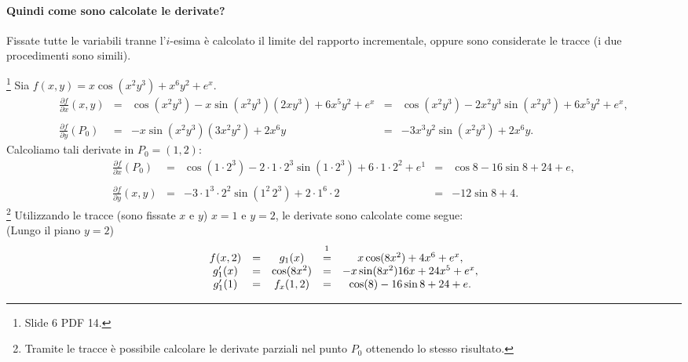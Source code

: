 \paragraph{Quindi come sono calcolate le derivate?} Fissate tutte le variabili tranne l'$i$-esima è calcolato il limite del rapporto incrementale, oppure sono considerate le tracce (i due procedimenti sono simili).

\begin{example}\footnote{Slide 6 PDF 14.}
    Sia $f(x,y)=x\cos(x^2y^3)+x^6y^2+e^x$.
    \begin{equation}\label{eq:derivate_parziali_metodo_normale}
        \begin{matrix}
            \frac{\partial f}{\partial x}(x,y)&=& \cos(x^2y^3)-x\sin(x^2y^3)(2xy^3)+6x^5y^2+e^x&=&\cos(x^2y^3)-2x^2y^3\sin(x^2y^3)+6x^5y^2+e^x,\\\\
            \frac{\partial f}{\partial y}(P_0)&=& -x\sin(x^2y^3)(3x^2y^2)+2x^6y&=&-3x^3y^2\sin(x^2y^3)+2x^6y.
        \end{matrix}
    \end{equation}
    Calcoliamo tali derivate in $P_0=(1,2)$:
    \begin{equation*}
        \begin{matrix}
            \frac{\partial f}{\partial x}(P_0)&=& \cos(1\cdot 2^3)-2\cdot 1\cdot 2^3\sin(1\cdot 2^3)+6\cdot 1\cdot 2^2+e^1&=&\cos8 -16\sin8+24+ e,\\\\
            \frac{\partial f}{\partial y}(x,y)&=&-3\cdot 1^3\cdot 2^2\sin(1^2\,2^3)+2\cdot1^6\cdot2 &=&-12\sin8+4.
        \end{matrix}
    \end{equation*}
    \footnote{Tramite le tracce è possibile calcolare le derivate parziali nel punto $P_0$ ottenendo lo stesso risultato.}
    Utilizzando le tracce (sono fissate $x$ e $y$) $x=1$ e $y=2$, le  derivate sono calcolate come segue:\\
    (Lungo il piano $y=2$)
    \begin{equation*}
        \begin{matrix}
            f(x,2)&=&g_1(x)&\overset{\footnotemark}{=}&x\cos(8x^2)+4x^6+e^x,\\
            g'_1(x)&=&\cos(8x^2)&=&-x\sin(8x^2)16x+24x^5+e^x,\\
            g'_1(1)&=& f_x(1,2)&=& \cos(8)-16\sin8+24+e.
        \end{matrix}
    \end{equation*}

\end{example}

